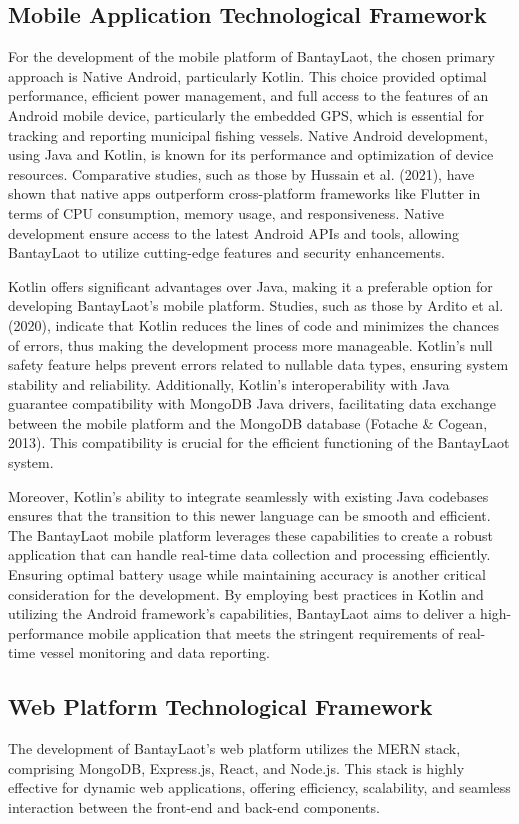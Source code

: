 \documentclass[journal]{IEEEtran}
\begin{document}
\subsection{Mobile Application Technological Framework}
For the development of the mobile platform of BantayLaot, the chosen primary approach is Native Android, particularly Kotlin. This choice provided optimal performance, efficient power management, and full access to the features of an Android mobile device, particularly the embedded GPS, which is essential for tracking and reporting municipal fishing vessels. Native Android development, using Java and Kotlin, is known for its performance and optimization of device resources. Comparative studies, such as those by Hussain et al. (2021), have shown that native apps outperform cross-platform frameworks like Flutter in terms of CPU consumption, memory usage, and responsiveness. Native development ensure access to the latest Android APIs and tools, allowing BantayLaot to utilize cutting-edge features and security enhancements.

Kotlin offers significant advantages over Java, making it a preferable option for developing BantayLaot’s mobile platform. Studies, such as those by Ardito et al. (2020), indicate that Kotlin reduces the lines of code and minimizes the chances of errors, thus making the development process more manageable. Kotlin's null safety feature helps prevent errors related to nullable data types, ensuring system stability and reliability. Additionally, Kotlin's interoperability with Java guarantee compatibility with MongoDB Java drivers, facilitating data exchange between the mobile platform and the MongoDB database (Fotache \& Cogean, 2013). This compatibility is crucial for the efficient functioning of the BantayLaot system.

Moreover, Kotlin's ability to integrate seamlessly with existing Java codebases ensures that the transition to this newer language can be smooth and efficient. The BantayLaot mobile platform leverages these capabilities to create a robust application that can handle real-time data collection and processing efficiently. Ensuring optimal battery usage while maintaining accuracy is another critical consideration for the development. By employing best practices in Kotlin and utilizing the Android framework's capabilities, BantayLaot aims to deliver a high-performance mobile application that meets the stringent requirements of real-time vessel monitoring and data reporting.

\subsection{Web Platform Technological Framework}
The development of BantayLaot’s web platform utilizes the MERN stack, comprising MongoDB, Express.js, React, and Node.js. This stack is highly effective for dynamic web applications, offering efficiency, scalability, and seamless interaction between the front-end and back-end components.
\end{document}
